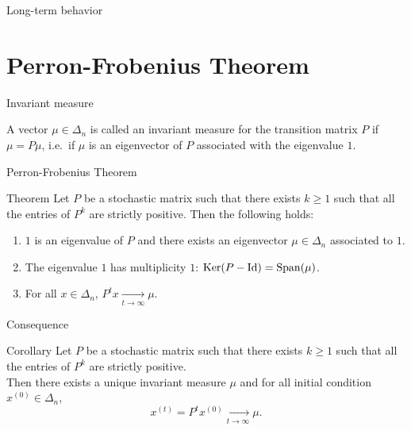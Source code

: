 \documentclass{beamer}
\begin{document}
\begin{frame}[t]{Long-term behavior}
	\grid


\end{frame}

\section{Perron-Frobenius Theorem}

\begin{frame}[t]{Invariant measure}
	\grid
	\begin{definition}
		A vector $\mu \in \Delta_n$ is called an invariant measure for the transition matrix $P$ if $\mu = P \mu$, i.e.\ if $\mu$ is an eigenvector of $P$ associated with the eigenvalue $1$.
	\end{definition}


\end{frame}

\begin{frame}[t]{Perron-Frobenius Theorem}
	\grid
	\begin{block}{Theorem}
		Let $P$ be a stochastic matrix such that there exists $k \geq 1$ such that all the entries of $P^k$ are strictly positive. Then the following holds:
		\begin{enumerate}
			\vspace{0.3cm}
		\item $1$ is an eigenvalue of $P$ and there exists an eigenvector $\mu \in \Delta_n$ associated to $1$.
			\vspace{0.3cm}
		\item The eigenvalue $1$ has multiplicity $1$: ${{\rm Ker}}(P-{{\rm Id}}) = {{\rm Span}}(\mu)$.
			\vspace{0.3cm}
		\item For all $x \in \Delta_n$, $P^t x \xrightarrow[t \to \infty]{} \mu$.
	\end{enumerate}
\end{block}
\end{frame}


\begin{frame}[t]{Consequence}
	\grid
	\begin{block}{Corollary}
		Let $P$ be a stochastic matrix such that there exists $k \geq 1$ such that all the entries of $P^k$ are strictly positive. 
		\\

		Then there exists a unique invariant measure $\mu$ and for all initial condition $x^{(0)} \in \Delta_n$,
		$$
		x^{(t)} = P^t x^{(0)} \xrightarrow[t \to \infty]{} \mu.
		$$
	\end{block}
\end{frame}
\end{document}

